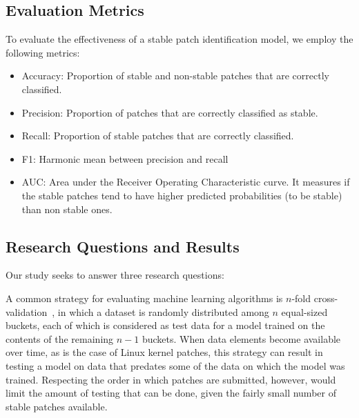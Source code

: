 

\subsection{Evaluation Metrics}
\label{sec:metrics}
To evaluate the effectiveness of a stable patch identification
model, we employ the following metrics:

\begin{itemize}[leftmargin=0.4cm]
\item Accuracy: Proportion of stable and non-stable patches that are correctly classified.
\item Precision: Proportion of patches that are correctly classified as stable. 
\item Recall: Proportion of stable patches that are correctly classified. 
\item F1: Harmonic mean between precision and recall
\item AUC: Area under the Receiver Operating Characteristic curve. It measures if the stable patches tend to have higher predicted probabilities (to be stable) than non stable ones. 
\end{itemize}


\subsection{Research Questions and Results}
\label{sec:rq}
Our study seeks to answer three research questions: 

\vspace{0.1cm}  A common strategy for evaluating machine learning
algorithms is $n$-fold cross-validation~\cite{kohavi1995study},
in which a dataset is randomly distributed among $n$ equal-sized buckets,
each of
which is considered as test data for a model trained on the contents of the
remaining $n-1$ buckets.  When data elements become available over time, as
is the case of Linux kernel patches, this strategy can result in testing a
model on data that predates some of the data on which the model was
trained.  Respecting the order in which patches are submitted,
however, would limit the amount of testing that can be done, given
the fairly small number of stable patches available.

